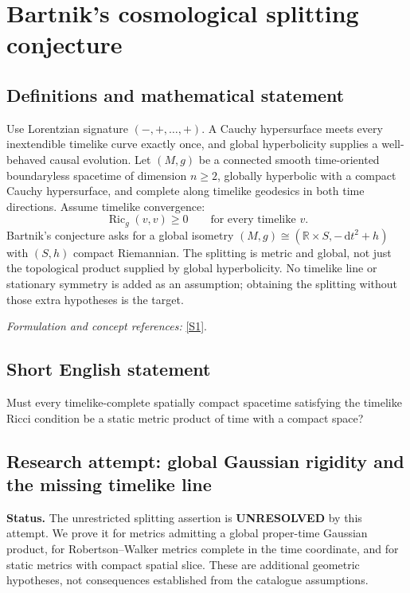 \documentclass[11pt]{article}
\begin{document}
\section*{\texorpdfstring{Bartnik's cosmological splitting conjecture}{Bartnik's cosmological splitting conjecture}}\label{398}
\subsection{Definitions and mathematical statement}
Use Lorentzian signature $(-,+,\ldots,+)$. A Cauchy hypersurface meets every inextendible timelike curve exactly once, and global hyperbolicity supplies a well-behaved causal evolution. Let $(M,g)$ be a connected smooth time-oriented boundaryless spacetime of dimension $n\ge2$, globally hyperbolic with a compact Cauchy hypersurface, and complete along timelike geodesics in both time directions. Assume timelike convergence:
\[
 \operatorname{Ric}_g(v,v)\ge0\qquad\text{for every timelike }v.
\]
Bartnik's conjecture asks for a global isometry $(M,g)\cong({\mathbb{R}}\times S,-{\,\mathrm{d}} t^2+h)$ with $(S,h)$ compact Riemannian. The splitting is metric and global, not just the topological product supplied by global hyperbolicity. No timelike line or stationary symmetry is added as an assumption; obtaining the splitting without those extra hypotheses is the target.
\par\smallskip\textit{Formulation and concept references:} \href{https://arxiv.org/html/1810.03183v2}{[S1]}.

\subsection{Short English statement}
Must every timelike-complete spatially compact spacetime satisfying the timelike Ricci condition be a static metric product of time with a compact space?
\subsection{Research attempt: global Gaussian rigidity and the missing timelike line}
\textbf{Status.} The unrestricted splitting assertion is \textbf{UNRESOLVED} by this attempt. We prove it for metrics admitting a global proper-time Gaussian product, for Robertson--Walker metrics complete in the time coordinate, and for static metrics with compact spatial slice. These are additional geometric hypotheses, not consequences established from the catalogue assumptions.
\end{document}
